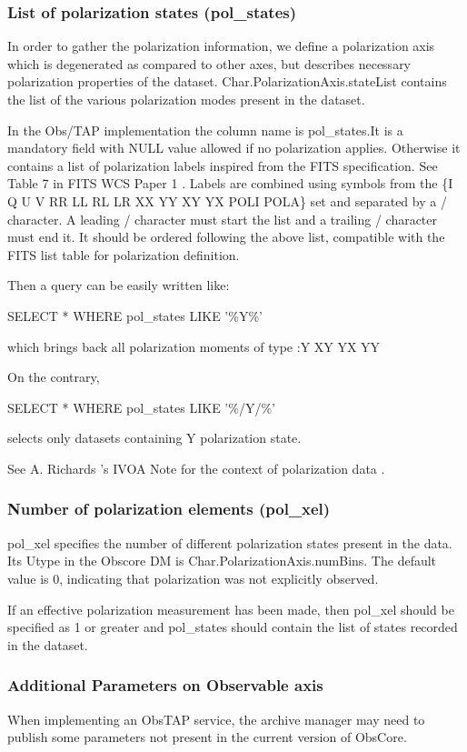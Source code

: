 \documentclass[11pt,a4paper]{ivoa}
\begin{document}
\subsubsection{List of polarization states (pol\_states)}
In order to gather the polarization information, we define a polarization axis which is degenerated as compared to other
axes, but describes necessary polarization properties of the dataset. Char.PolarizationAxis.stateList contains the list
of the various polarization modes present in the dataset. 

In the Obs/TAP implementation the column name is pol\_states.It is a mandatory field with NULL value allowed if no
polarization applies. Otherwise it contains a list of polarization labels inspired from the FITS specification. See
Table 7 in FITS WCS Paper 1 \citep{2002A&A...395.1061G} . Labels are combined using symbols from the \{I Q U V RR LL RL LR
XX YY XY YX POLI POLA\} set and separated by a / character. A leading / character must start the list and a trailing /
character must end it. It should be ordered following the above list, compatible with the FITS list table for
polarization definition.

Then a query can be easily written like:

SELECT * WHERE pol\_states LIKE '\%Y\%' 

which brings back all polarization moments of type :Y XY YX YY 

On the contrary, 

SELECT * WHERE pol\_states LIKE '\%/Y/\%' 

selects only datasets containing Y polarization state.

See A. Richards 's IVOA Note \citep{IVOANote:Polarisation} for the context of polarization data . 

\subsubsection{Number of polarization elements (pol\_xel)}
pol\_xel specifies the number of different polarization states present in the data. Its Utype in the Obscore DM is
Char.PolarizationAxis.numBins. The default value is 0, indicating that polarization was not explicitly observed.

If an effective polarization measurement has been made, then pol\_xel should be specified as 1 or greater and 
pol\_states should contain the list of states recorded in the dataset.

\subsubsection{Additional Parameters on Observable axis}
When implementing an ObsTAP service, the archive manager may need to publish some parameters not present in the current
version of ObsCore.
\end{document}
